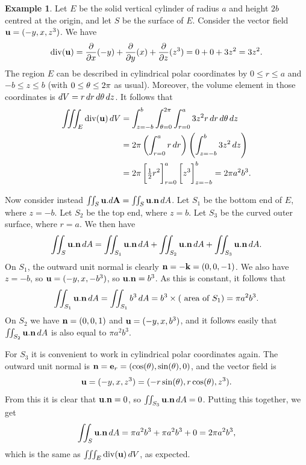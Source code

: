 \documentclass[reqno]{amsart}
\theoremstyle{definition}
\newtheorem{example}[theorem]{Example}
\begin{document}
\begin{example}
 Let $E$ be the solid vertical cylinder of radius $a$ and height $2b$
 centred at the origin, and let $S$ be the surface of $E$.  Consider
 the vector field $\mathbf{u}=(-y,x,z^3)$.  We have 
 \[ \operatorname{div}(\mathbf{u}) = \frac{\partial}{\partial x}(-y) + \frac{\partial}{\partial y}(x) + \frac{\partial}{\partial z}(z^3) = 0 + 0 + 3z^2 = 3z^2.
 \]
 The region $E$ can be described in cylindrical polar coordinates
 by $0\leq r\leq a$ and $-b\leq z\leq b$ (with $0\leq\theta\leq 2\pi$ as
 usual).  Moreover, the volume element in those coordinates is
 $dV=r\,dr\,d\theta\,dz$.  It follows that
 \begin{align*}
  \iiint_E \dv(\vu)\,dV 
   &= \int_{z=-b}^b\int_{\tht=0}^{2\pi}\int_{r=0}^a
        3z^2r\,dr\,d\tht\,dz \\
   &= 2\pi\left(\int_{r=0}^a r\,dr\right)
       \left(\int_{z=-b}^b 3z^2\,dz\right) \\
   &= 2\pi\CH{\half r^2}_{r=0}^a\CH{z^3}_{z=-b}^b 
    = 2\pi a^2b^3.
 \end{align*}

 Now consider instead $\iint_S\mathbf{u}.d\mathbf{A}=\iint_S\mathbf{u}.\mathbf{n}\,dA$.  Let $S_1$
 be the bottom end of $E$, where $z=-b$.  Let $S_2$ be the top end,
 where $z=b$.  Let $S_3$ be the curved outer surface, where $r=a$.  We
 then have 
 \[ \iint_S\mathbf{u}.\mathbf{n}\,dA = 
    \iint_{S_1}\mathbf{u}.\mathbf{n}\,dA + 
    \iint_{S_2}\mathbf{u}.\mathbf{n}\,dA + 
    \iint_{S_3}\mathbf{u}.\mathbf{n}\,dA. 
 \]
 On $S_1$, the outward unit normal is clearly $\mathbf{n}=-\mathbf{k}=(0,0,-1)$.  We
 also have $z=-b$, so $\mathbf{u}=(-y,x,-b^3)$, so $\mathbf{u}.\mathbf{n}=b^3$.  As this is
 constant, it follows that 
 \[ \iint_{S_1}\mathbf{u}.\mathbf{n} \,dA
     = \iint_{S_1} b^3\,dA = b^3\times (\text{ area of } S_1)
     = \pi a^2b^3.
 \]
 On $S_2$ we have $\mathbf{n}=(0,0,1)$ and $\mathbf{u}=(-y,x,b^3)$, and it follows
 easily that $\iint_{S_2}\mathbf{u}.\mathbf{n}\,dA$ is also equal to $\pi a^2b^3$.  

 For $S_3$ it is convenient to work in cylindrical polar coordinates
 again.  The outward unit normal is $\mathbf{n}=\mathbf{e}_r=(\cos(\theta),\sin(\theta),0)$,
 and the vector field is 
 \[ \mathbf{u} = (-y,x,z^3) = (-r\sin(\theta),r\cos(\theta),z^3). \]
 From this it is clear that $\mathbf{u}.\mathbf{n}=0$, so
 $\iint_{S_3}\mathbf{u}.\mathbf{n}\,dA=0$.  Putting this together, we get 
 \[ \iint_S\mathbf{u}.\mathbf{n}\,dA = \pi a^2b^3 + \pi a^2b^3 + 0 = 2\pi a^2b^3, \]
 which is the same as $\iiint_E\operatorname{div}(\mathbf{u})\,dV$, as expected.
\end{example}
\end{document}
